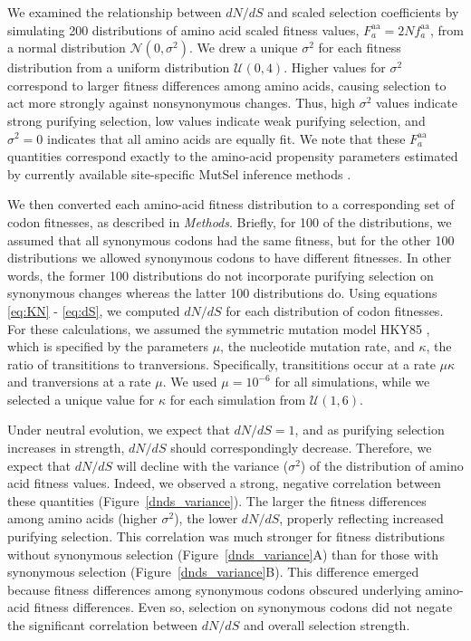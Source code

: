 \documentclass{pnastwo}
\begin{document}
\begin{article}
We examined the relationship between $dN/dS$ and scaled selection coefficients by simulating 200 distributions of amino acid scaled fitness values, $F^\text{aa}_a = 2Nf^\text{aa}_a$, from a normal distribution $\mathcal{N}(0,\sigma^2)$. We drew a unique $\sigma^2$ for each fitness distribution from a uniform distribution $\mathcal{U}(0,4)$. Higher values for $\sigma^2$ correspond to larger fitness differences among amino acids, causing selection to act more strongly against nonsynonymous changes. Thus, high $\sigma^2$ values indicate strong purifying selection, low values indicate weak purifying selection, and $\sigma^2 = 0$ indicates that all amino acids are equally fit. We note that these $F^\text{aa}_a$ quantities correspond exactly to the amino-acid propensity parameters estimated by currently available site-specific MutSel inference methods \cite{RodrigueLartillot2014,Tamurietal2014}.

We then converted each amino-acid fitness distribution to a corresponding set of codon fitnesses, as described in \emph{Methods}. Briefly, for 100 of the distributions, we assumed that all synonymous codons had the same fitness, but for the other 100 distributions we allowed synonymous codons to have different fitnesses. In other words, the former 100 distributions do not incorporate purifying selection on synonymous changes whereas the latter 100 distributions do. Using equations \eqref{eq:KN} - \eqref{eq:dS}, we computed $dN/dS$ for each distribution of codon fitnesses. For these calculations, we assumed the symmetric mutation model HKY85 \cite{HKY85}, which is specified by the parameters $\mu$, the nucleotide mutation rate, and $\kappa$, the ratio of transititions to tranversions. Specifically, transititions occur at a rate $\mu\kappa$ and tranversions at a rate $\mu$. We used $\mu = 10^{-6}$ for all simulations, while we selected a unique value for $\kappa$ for each simulation from $\mathcal{U}(1,6)$.

Under neutral evolution, we expect that $dN/dS = 1$, and as purifying selection increases in strength, $dN/dS$ should correspondingly decrease. Therefore, we expect that $dN/dS$ will decline with the variance ($\sigma^2$) of the distribution of amino acid fitness values. Indeed, we observed a strong, negative correlation between these quantities (Figure~\ref{dnds_variance}). The larger the fitness differences among amino acids (higher $\sigma^2$), the lower $dN/dS$, properly reflecting increased purifying selection. This correlation was much stronger for fitness distributions without synonymous selection (Figure~\ref{dnds_variance}A) than for those with synonymous selection (Figure~\ref{dnds_variance}B). This difference emerged because fitness differences among synonymous codons obscured underlying amino-acid fitness differences. Even so, selection on synonymous codons did not negate the significant correlation between $dN/dS$ and overall selection strength.


\end{article}
\end{document}
